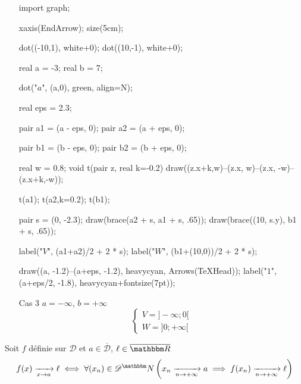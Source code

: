 \begin{prv}
\begin{itemize}
			\begin{center}
				\begin{asy}
					import graph;

					xaxis(EndArrow);
					size(5cm);

					dot((-10,1), white+0);
					dot((10,-1), white+0);

					real a = -3;
					real b = 7;

					dot("$a$", (a,0), green, align=N);

					real eps = 2.3;

					pair a1 = (a - eps, 0);
					pair a2 = (a + eps, 0);

					pair b1 = (b - eps, 0);
					pair b2 = (b + eps, 0);
					
					real w = 0.8;
					void t(pair z, real k=-0.2) {draw((z.x+k,w)--(z.x, w)--(z.x, -w)--(z.x+k,-w));}

					t(a1); t(a2,k=0.2);
					t(b1);

					pair s = (0, -2.3);
					draw(brace(a2 + s, a1 + s, .65));
					draw(brace((10, s.y), b1 + s, .65));

					label("$V$", (a1+a2)/2 + 2 * s);
					label("$W$", (b1+(10,0))/2 + 2 * s);

					draw((a, -1.2)--(a+eps, -1.2), heavycyan, Arrows(TeXHead));
					label("$1$", (a+eps/2, -1.8), heavycyan+fontsize(7pt));
				\end{asy}
			\end{center}
		\item[\sc Cas 3] $a = -\infty$, $b = +\infty$ \\
			\[
				\begin{cases}
					V = ]-\infty; 0[\\
					W = ]0;+\infty[
				\end{cases}
			\] 
	\end{itemize}
\end{prv}

\begin{thm}
	Soit $f$ définie sur $\mathcal{D}$ et $a \in \overline{\mathcal{D}}$, $\ell \in \overline{\R}$ \[
		f(x) \tendsto{x \to a} \ell \iff \forall (x_n) \in \mathcal{D}^\N \left( x_n \tendsto{n\to +\infty} a \implies f(x_n) \tendsto{n \to +\infty} \ell \right) 
	\]
\end{thm}


